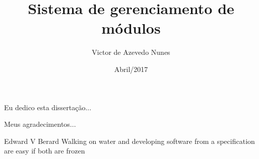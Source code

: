 \documentclass[pt,twoside,onehalfspacing,bsc]{risethesis}
\title{Sistema de gerenciamento de módulos}
\date{Abril/2017}
\author{Victor de Azevedo Nunes}
\begin{document}
\frontmatter
\frontpage
\presentationpage

\begin{dedicatory}
Eu dedico esta dissertação...
\end{dedicatory}

\acknowledgements
Meus agradecimentos...

\begin{epigraph}[]{Edward V Berard}
Walking on water and developing software from a specification are easy if both are frozen
\end{epigraph}

\resumo


\abstract


\tableofcontents

\listoffigures

\listoftables

\listofacronyms



\mainmatter





% 
% 
% 
% 
% 

%


\clearpage
\addappheadtotoc
\appendix
\appendixpage
% 
\end{document}

